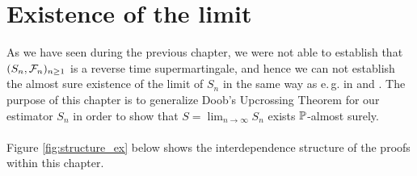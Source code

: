 \chapter{Existence of the limit} \label{ch:ex_limit}

As we have seen during the previous chapter, we were not able to establish that $(S_n, \F_n)_ {n\geq 1}$ is a reverse time supermartingale, and hence we can not establish the almost sure existence of the limit of $S_n$ in the same way as e.\,g. in \cite{dikta2000strong} and \cite{bose1999strong}. The purpose of this chapter is to generalize Doob's Upcrossing Theorem for our estimator $S_n$ in order to show that $S=\lim_{n\to\infty} S_n$ exists $\P$-almost surely.\\
\\
%
Figure \ref{fig:structure_ex} below shows the interdependence structure of the proofs within this chapter.
\setlength{\fboxsep}{5pt}
